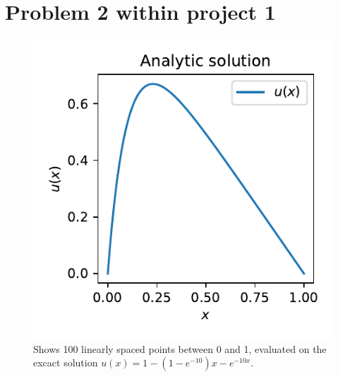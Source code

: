 \documentclass{article}
\begin{document}
\section{Problem 2 within project 1}


\begin{figure}
    \includegraphics{problem_2_fig.pdf}
    \caption{Shows 100 linearly spaced points between 0 and 1, evaluated on the excact solution $u(x)=1 - (1 - e^{-10})x - e^{-10x}$.}
\end{figure}
\end{document}
